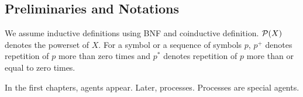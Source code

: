   \subsection{Preliminaries and Notations}

  We assume inductive definitions using BNF and coinductive definition.
  ${\mathcal P({X})}$ denotes the powerset of $X$.
  For a symbol or a sequence of symbols $p$,
  $p^+$ denotes repetition of $p$ more than zero times and
  $p^*$ denotes repetition of $p$ more than or equal to zero times.

  In the first chapters, agents appear.  Later, processes.  Processes
  are special agents.